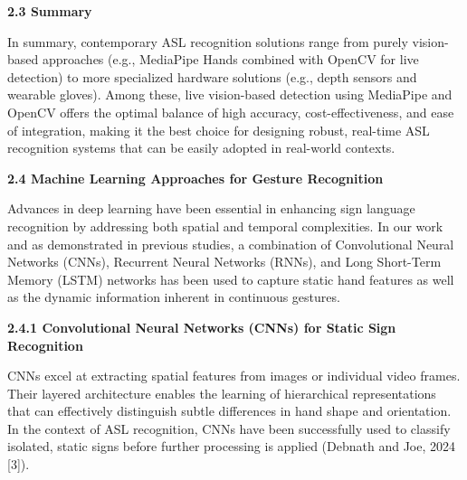 \documentclass[12pt]{article}
\begin{document}
\vspace{1.5em}
\noindent
\textbf{2.3 Summary}
\vspace{1em}

In summary, contemporary ASL recognition solutions range from purely vision-based 
approaches (e.g., MediaPipe Hands combined with OpenCV for live detection) to more 
specialized hardware solutions (e.g., depth sensors and wearable gloves). Among these, live 
vision-based detection using MediaPipe and OpenCV offers the optimal balance of high 
accuracy, cost-effectiveness, and ease of integration, making it the best choice for designing 
robust, real-time ASL recognition systems that can be easily adopted in real-world contexts.


\vspace{1.5em}
\noindent
\textbf{2.4 Machine Learning Approaches for Gesture Recognition}
\vspace{1em}

Advances in deep learning have been essential in enhancing sign language recognition 
by addressing both spatial and temporal complexities. In our work and as demonstrated 
in previous studies, a combination of Convolutional Neural Networks (CNNs), Recurrent 
Neural Networks (RNNs), and Long Short-Term Memory (LSTM) networks has been used 
to capture static hand features as well as the dynamic information inherent in continuous 
gestures.

\vspace{1em}
\noindent
\textbf{2.4.1 Convolutional Neural Networks (CNNs) for Static Sign Recognition}
\vspace{1em}

CNNs excel at extracting spatial features from images or individual video frames. 
Their layered architecture enables the learning of hierarchical representations that can 
effectively distinguish subtle differences in hand shape and orientation. In the context of ASL 
recognition, CNNs have been successfully used to classify isolated, static signs before further 
processing is applied (Debnath and Joe, 2024 [3]).
\end{document}
